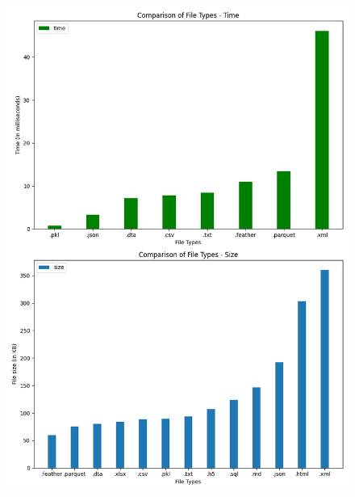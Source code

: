 \documentclass[11pt]{article}
\begin{document}
\begin{figure}[H]
  \centering
  \includegraphics[width=1\textwidth]{SBIN.png}
\end{figure}
\end{document}
